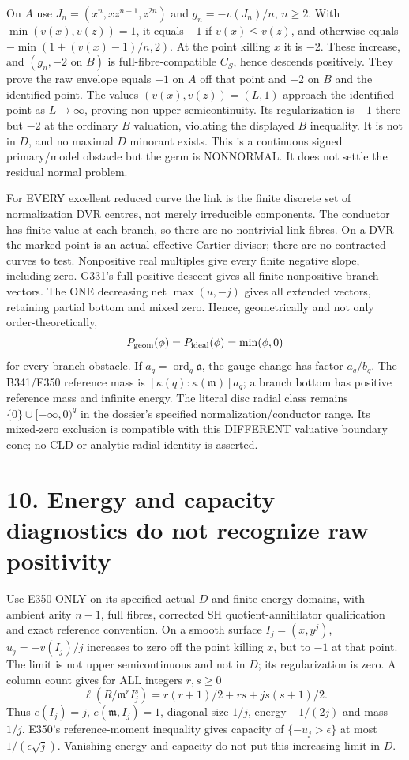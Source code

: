 \documentclass[11pt]{article}
\begin{document}
On \(A\) use \(J_n=(x^n,xz^{n-1},z^{2n})\) and \(g_n=-v(J_n)/n\), \(n\ge2\). With \(\min(v(x),v(z))=1\), it equals \(-1\) if \(v(x)\le v(z)\), and otherwise equals \(-\min(1+(v(x)-1)/n,2)\). At the point killing \(x\) it is \(-2\). These increase, and \((g_n,-2\text{ on }B)\) is full-fibre-compatible \(C_S\), hence descends positively. They prove the raw envelope equals \(-1\) on \(A\) off that point and \(-2\) on \(B\) and the identified point. The values \((v(x),v(z))=(L,1)\) approach the identified point as \(L\to\infty\), proving non-upper-semicontinuity. Its regularization is \(-1\) there but \(-2\) at the ordinary \(B\) valuation, violating the displayed \(B\) inequality. It is not in \(D\), and no maximal \(D\) minorant exists. This is a continuous signed primary/model obstacle but the germ is NONNORMAL. It does not settle the residual normal problem.

For EVERY excellent reduced curve the link is the finite discrete set of normalization DVR centres, not merely irreducible components. The conductor has finite value at each branch, so there are no nontrivial link fibres. On a DVR the marked point is an actual effective Cartier divisor; there are no contracted curves to test. Nonpositive real multiples give every finite negative slope, including zero. G331's full positive descent gives all finite nonpositive branch vectors. The ONE decreasing net \(\max(u,-j)\) gives all extended vectors, retaining partial bottom and mixed zero. Hence, geometrically and not only order-theoretically,
\[
P_{\rm geom}(\phi)=P_{\rm ideal}(\phi)=\min(\phi,0)
\]
for every branch obstacle. If \(a_q=\operatorname{ord}_q\mathfrak a\), the gauge change has factor \(a_q/b_q\). The B341/E350 reference mass is \([\kappa(q):\kappa(\mathfrak m)]a_q\); a branch bottom has positive reference mass and infinite energy. The literal disc radial class remains \(\{0\}\cup[-\infty,0)^q\) in the dossier's specified normalization/conductor range. Its mixed-zero exclusion is compatible with this DIFFERENT valuative boundary cone; no CLD or analytic radial identity is asserted.

\section{10. Energy and capacity diagnostics do not recognize raw positivity}

Use E350 ONLY on its specified actual \(D\) and finite-energy domains, with ambient arity \(n-1\), full fibres, corrected SH quotient-annihilator qualification and exact reference convention. On a smooth surface \(I_j=(x,y^j)\), \(u_j=-v(I_j)/j\) increases to zero off the point killing \(x\), but to \(-1\) at that point. The limit is not upper semicontinuous and not in \(D\); its regularization is zero. A column count gives for ALL integers \(r,s\ge0\)
\[
\ell(R/\mathfrak m^r I_j^s)=r(r+1)/2+rs+j s(s+1)/2.
\]
Thus \(e(I_j)=j\), \(e(\mathfrak m,I_j)=1\), diagonal size \(1/j\), energy \(-1/(2j)\) and mass \(1/j\). E350's reference-moment inequality gives capacity of \(\{-u_j>\epsilon\}\) at most \(1/(\epsilon\sqrt j)\). Vanishing energy and capacity do not put this increasing limit in \(D\).
\end{document}
